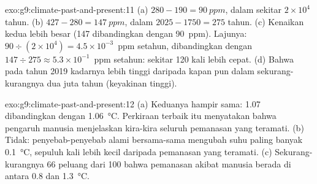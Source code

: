 \begin{solution}{exo:g9:climate-past-and-present:11}
(a) $280 - 190 = \qty{90}{ppm}$, dalam sekitar $2 \times 10^4$ tahun. (b) $427
- 280 = \qty{147}{ppm}$, dalam $2025 - 1750 = 275$ tahun. (c) Kenaikan
kedua lebih besar (147 dibandingkan dengan 90~ppm). Lajunya: $90 \div (2 \times 10^4) =
4.5 \times 10^{-3}$~ppm setahun, dibandingkan dengan $147 \div 275 \approx 5.3 \times
10^{-1}$~ppm setahun: sekitar 120 kali lebih cepat. (d) Bahwa pada tahun
2019 kadarnya lebih tinggi daripada kapan pun dalam sekurang-kurangnya dua
juta tahun (keyakinan tinggi).
\end{solution}

\begin{solution}{exo:g9:climate-past-and-present:12}
(a) Keduanya hampir sama: 1.07 dibandingkan dengan
\qty{1.06}{\degreeCelsius}. Perkiraan terbaik itu menyatakan bahwa
pengaruh manusia menjelaskan kira-kira seluruh pemanasan yang teramati.
(b) Tidak: penyebab-penyebab alami bersama-sama mengubah suhu paling
banyak \qty{0.1}{\degreeCelsius}, sepuluh kali lebih kecil daripada
pemanasan yang teramati. (c) Sekurang-kurangnya 66 peluang dari 100 bahwa
pemanasan akibat manusia berada di antara 0.8 dan
\qty{1.3}{\degreeCelsius}.
\end{solution}

